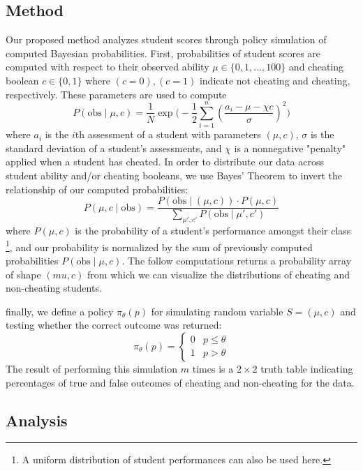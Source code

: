 \documentclass[review,sigconf]{acmart}
\begin{document}
\subsection{Method}
Our proposed method analyzes student scores through policy simulation of computed Bayesian probabilities.
First, probabilities of student scores are computed with respect to their observed ability \(\mu\in \{0, 1, ..., 100\}\) and cheating boolean
\(c \in \{0, 1\}\) where \((c = 0), (c = 1)\) indicate not cheating and cheating, respectively. These parameters are used to compute
\begin{equation}
P(\text{obs} \mid \mu, c) = \frac{1}{N}\exp\bigg(-\frac{1}{2}\sum_{i=1}^{n} \left( \frac{a_i - \mu - \chi c}{\sigma} \right)^{2} \bigg)
\end{equation}
where \(a_i\) is the \(i\)th assessment of a student with parameters \((\mu, c)\), \(\sigma\) is the standard deviation of a student's assessments, and \(\chi\) is a nonnegative "penalty" applied
when a student has cheated. In order to distribute our data across student ability and/or cheating booleans, we use Bayes' Theorem to invert the relationship
of our computed probabilities:
\begin{equation}
	P(\mu, c \mid \text{obs}) = \frac{P(\text{obs}\mid (\mu, c)) \cdot P(\mu, c)}{\sum_{\mu', c'}P(\text{obs} \mid \mu', c')}
\end{equation}
where \(P(\mu, c)\) is the probability of a student's performance amongst their class \footnote[1]{A uniform distribution of student performances can also be used here.}, 
and our probability is normalized by the sum of previously computed probabilities \(P(\text{obs}\mid \mu, c)\). The follow computations returns a
probability array of shape \((mu, c)\) from which we can visualize the distributions of cheating and non-cheating students.

finally, we define a policy \(\pi_\theta(p)\) for simulating random variable \(S = (\mu, c)\) and testing whether the correct outcome was returned:
\begin{equation}
	\pi_\theta(p) = 
	\begin{cases}
		0 & p \le \theta\\
		1 & p > \theta 
	\end{cases}
\end{equation}
The result of performing this simulation \(m\) times is a \(2\times 2\) truth table indicating percentages of true and false outcomes of cheating and non-cheating for the data.
\subsection{Analysis}
\end{document}
